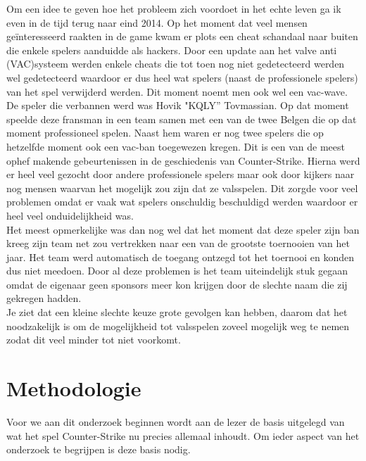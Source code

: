 \documentclass[pdftex,a4paper,12pt,twoside]{report}
\begin{document}
Om een idee te geven hoe het probleem zich voordoet in het echte leven ga ik even in de tijd terug naar eind 2014. Op het moment dat veel mensen geïnteresseerd raakten in de game kwam er plots een \gls{cheat} schandaal naar buiten die enkele spelers aanduidde als hackers. Door een update aan het \gls{valve} \gls{anti} (VAC)systeem werden enkele \gls{cheat}s die tot toen nog niet gedetecteerd werden wel gedetecteerd waardoor er dus heel wat spelers (naast de professionele spelers) van het spel verwijderd werden. Dit moment noemt men ook wel een \gls{vac}-wave.
\\

De speler die verbannen werd was Hovik "KQLY'' Tovmassian. Op dat moment speelde deze fransman in een team samen met een van de twee Belgen die op dat moment professioneel spelen. Naast hem waren er nog twee spelers die op hetzelfde moment ook een \gls{vac}-ban toegewezen kregen. Dit is een van de meest ophef makende gebeurtenissen in de geschiedenis van Counter-Strike. Hierna werd er heel veel gezocht door andere professionele spelers maar ook door kijkers naar nog mensen waarvan het mogelijk zou zijn dat ze valsspelen. Dit zorgde voor veel problemen omdat er vaak wat spelers onschuldig beschuldigd werden waardoor er heel veel onduidelijkheid was.\citep{pcgamerhackingscandal}
\\

Het meest opmerkelijke was dan nog wel dat het moment dat deze speler zijn ban kreeg zijn team net zou vertrekken naar een van de grootste toernooien van het jaar. Het team werd automatisch de toegang ontzegd tot het toernooi en konden dus niet meedoen. Door al deze problemen is het team uiteindelijk stuk gegaan omdat de eigenaar geen sponsors meer kon krijgen door de slechte naam die zij gekregen hadden. \citep{titan}
\\

Je ziet dat een kleine slechte keuze grote gevolgen kan hebben, daarom dat het noodzakelijk is om de mogelijkheid tot valsspelen zoveel mogelijk weg te nemen zodat dit veel minder tot niet voorkomt.

\chapter{Methodologie}
\label{ch:methodologie}
Voor we aan dit onderzoek beginnen wordt aan de lezer de basis uitgelegd van wat het spel Counter-Strike nu precies allemaal inhoudt. Om ieder aspect van het onderzoek te begrijpen is deze basis nodig.
\\
\end{document}
